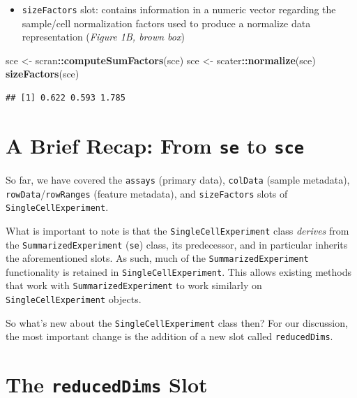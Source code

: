\documentclass[]{book}
\newenvironment{Shaded}{\begin{snugshade}}{\end{snugshade}}
\newcommand{\KeywordTok}[1]{\textcolor[rgb]{0.13,0.29,0.53}{\textbf{#1}}}
\newcommand{\NormalTok}[1]{#1}
\newcommand{\OperatorTok}[1]{\textcolor[rgb]{0.81,0.36,0.00}{\textbf{#1}}}
\newcommand{\StringTok}[1]{\textcolor[rgb]{0.31,0.60,0.02}{#1}}
\providecommand{\tightlist}{%
  \setlength{\itemsep}{0pt}\setlength{\parskip}{0pt}}
\begin{document}
\begin{itemize}
\tightlist
\item
  \texttt{sizeFactors} slot: contains information in a numeric vector regarding the sample/cell normalization factors used to produce a normalize data representation (\emph{Figure 1B, brown box})
\end{itemize}

\begin{Shaded}
\begin{Highlighting}[]
\NormalTok{sce <-}\StringTok{ }\NormalTok{scran}\OperatorTok{::}\KeywordTok{computeSumFactors}\NormalTok{(sce)}
\NormalTok{sce <-}\StringTok{ }\NormalTok{scater}\OperatorTok{::}\KeywordTok{normalize}\NormalTok{(sce)}
\KeywordTok{sizeFactors}\NormalTok{(sce)}
\end{Highlighting}
\end{Shaded}

\begin{verbatim}
## [1] 0.622 0.593 1.785
\end{verbatim}

\hypertarget{a-brief-recap-from-se-to-sce}{%
\section{\texorpdfstring{A Brief Recap: From \texttt{se} to \texttt{sce}}{A Brief Recap: From se to sce}}\label{a-brief-recap-from-se-to-sce}}

So far, we have covered the \texttt{assays} (primary data), \texttt{colData} (sample metadata), \texttt{rowData}/\texttt{rowRanges} (feature metadata), and \texttt{sizeFactors} slots of \texttt{SingleCellExperiment}.

What is important to note is that the \texttt{SingleCellExperiment} class \emph{derives} from the \texttt{SummarizedExperiment} (\texttt{se}) class, its predecessor, and in particular inherits the aforementioned slots. As such, much of the \texttt{SummarizedExperiment} functionality is retained in \texttt{SingleCellExperiment}. This allows existing methods that work with \texttt{SummarizedExperiment} to work similarly on \texttt{SingleCellExperiment} objects.

So what's new about the \texttt{SingleCellExperiment} class then? For our discussion, the most important change is the addition of a new slot called \texttt{reducedDims}.

\hypertarget{the-reduceddims-slot}{%
\section{\texorpdfstring{The \texttt{reducedDims} Slot}{The reducedDims Slot}}\label{the-reduceddims-slot}}
\end{document}
